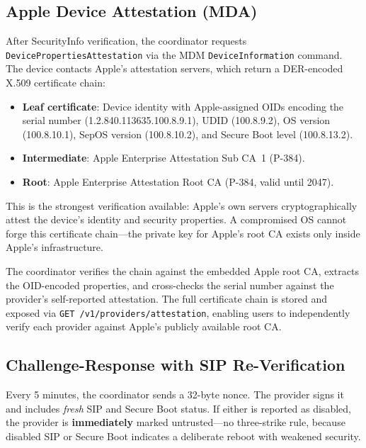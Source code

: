 \documentclass[10pt,twocolumn,letterpaper]{article}
\begin{document}
\subsection{Apple Device Attestation (MDA)}

After SecurityInfo verification, the coordinator requests \texttt{DevicePropertiesAttestation} via the MDM \texttt{DeviceInformation} command. The device contacts Apple's attestation servers, which return a DER-encoded X.509 certificate chain:

\begin{itemize}[leftmargin=*,itemsep=1pt]
    \item \textbf{Leaf certificate}: Device identity with Apple-assigned OIDs encoding the serial number (1.2.840.113635.100.8.9.1), UDID (100.8.9.2), OS version (100.8.10.1), SepOS version (100.8.10.2), and Secure Boot level (100.8.13.2).
    \item \textbf{Intermediate}: Apple Enterprise Attestation Sub CA~1 (P-384).
    \item \textbf{Root}: Apple Enterprise Attestation Root CA (P-384, valid until 2047).
\end{itemize}

This is the strongest verification available: Apple's own servers cryptographically attest the device's identity and security properties. A compromised OS cannot forge this certificate chain---the private key for Apple's root CA exists only inside Apple's infrastructure.

The coordinator verifies the chain against the embedded Apple root CA, extracts the OID-encoded properties, and cross-checks the serial number against the provider's self-reported attestation. The full certificate chain is stored and exposed via \texttt{GET /v1/providers/attestation}, enabling users to independently verify each provider against Apple's publicly available root CA.

\subsection{Challenge-Response with SIP Re-Verification}

Every 5 minutes, the coordinator sends a 32-byte nonce. The provider signs it and includes \emph{fresh} SIP and Secure Boot status. If either is reported as disabled, the provider is \textbf{immediately} marked untrusted---no three-strike rule, because disabled SIP or Secure Boot indicates a deliberate reboot with weakened security.
\end{document}
